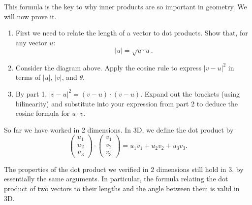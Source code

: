 \documentclass{article}
\begin{document}
This formula is the key to why inner products are so important in geometry. We will now prove it.\medskip

\begin{center}
\end{center}

\begin{enumerate}
	\item First we need to relate the length of a vector to dot products. Show that, for any vector $u$:
		\[|u|=\sqrt{u\cdot u}.\]
	\item Consider the diagram above. Apply the cosine rule to express $|v-u|^2$ in terms of $|u|$, $|v|$, and $\theta$.
	\item By part 1, $|v-u|^2=(v-u)\cdot(v-u)$. Expand out the brackets (using bilinearity) and substitute into your expression from part 2 to deduce the cosine formula for $u\cdot v$.
\end{enumerate}\bigskip


So far we have worked in 2 dimensions. In 3D, we define the dot product by
\[\left(\begin{array}{c}u_1\\u_2\\u_3\end{array}\right)\cdot\left(\begin{array}{c}v_1\\v_2\\v_3\end{array}\right)=u_1v_1+u_2v_2+u_3v_3.\]

The properties of the dot product we verified in 2 dimensions still hold in 3, by essentially the same arguments. In particular, the formula relating the dot product of two vectors to their lengths and the angle between them is valid in 3D.









\clearpage
\end{document}
